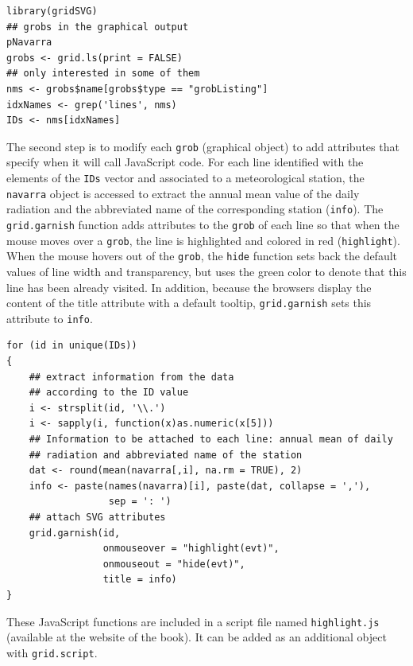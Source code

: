\lstset{language=r,label= ,caption= ,captionpos=b,numbers=none}
\begin{lstlisting}
library(gridSVG)
## grobs in the graphical output
pNavarra
grobs <- grid.ls(print = FALSE)
## only interested in some of them
nms <- grobs$name[grobs$type == "grobListing"]
idxNames <- grep('lines', nms)
IDs <- nms[idxNames]
\end{lstlisting}

The second step is to modify each \texttt{grob} (graphical object) to add
attributes that specify when it will call JavaScript code. For each
line identified with the elements of the \texttt{IDs} vector and associated
to a meteorological station, the \texttt{navarra} object is accessed to
extract the annual mean value of the daily radiation and the
abbreviated name of the corresponding station (\texttt{info}).  The
\texttt{grid.garnish} function adds attributes to the \texttt{grob} of each line so
that when the mouse moves over a \texttt{grob}, the line is highlighted and
colored in red (\texttt{highlight}). When the mouse hovers out of the \texttt{grob},
the \texttt{hide} function sets back the default values of line width and
transparency, but uses the green color to denote that this line has
been already visited. In addition, because the browsers display the
content of the title attribute with a default tooltip, \texttt{grid.garnish}
sets this attribute to \texttt{info}.


\lstset{language=r,label= ,caption= ,captionpos=b,numbers=none}
\begin{lstlisting}
for (id in unique(IDs))
{
    ## extract information from the data
    ## according to the ID value
    i <- strsplit(id, '\\.')
    i <- sapply(i, function(x)as.numeric(x[5]))
    ## Information to be attached to each line: annual mean of daily
    ## radiation and abbreviated name of the station
    dat <- round(mean(navarra[,i], na.rm = TRUE), 2)
    info <- paste(names(navarra)[i], paste(dat, collapse = ','),
                  sep = ': ')
    ## attach SVG attributes
    grid.garnish(id,
                 onmouseover = "highlight(evt)",
                 onmouseout = "hide(evt)",
                 title = info)
}
\end{lstlisting}

These JavaScript functions are included in a script file named
\texttt{highlight.js} (available at the website of the book). It can be
added as an additional object with \texttt{grid.script}.

